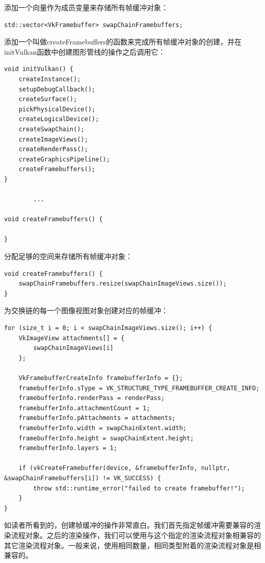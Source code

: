 \documentclass{ctexart}
\begin{document}
添加一个向量作为成员变量来存储所有帧缓冲对象：

\begin{lstlisting}[language={[ANSI]C}]
std::vector<VkFramebuffer> swapChainFramebuffers;
\end{lstlisting}

添加一个叫做createFramebuffers的函数来完成所有帧缓冲对象的创建，并在initVulkan函数中创建图形管线的操作之后调用它：

\begin{lstlisting}[language={[ANSI]C}]
void initVulkan() {
	createInstance();
	setupDebugCallback();
	createSurface();
	pickPhysicalDevice();
	createLogicalDevice();
	createSwapChain();
	createImageViews();
	createRenderPass();
	createGraphicsPipeline();
	createFramebuffers();
}

		...

void createFramebuffers() {

}
\end{lstlisting}

分配足够的空间来存储所有帧缓冲对象：

\begin{lstlisting}[language={[ANSI]C}]
void createFramebuffers() {
	swapChainFramebuffers.resize(swapChainImageViews.size());
}
\end{lstlisting}

为交换链的每一个图像视图对象创建对应的帧缓冲：

\begin{lstlisting}[language={[ANSI]C}]
for (size_t i = 0; i < swapChainImageViews.size(); i++) {
	VkImageView attachments[] = {
		swapChainImageViews[i]
	};

	VkFramebufferCreateInfo framebufferInfo = {};
	framebufferInfo.sType = VK_STRUCTURE_TYPE_FRAMEBUFFER_CREATE_INFO;
	framebufferInfo.renderPass = renderPass;
	framebufferInfo.attachmentCount = 1;
	framebufferInfo.pAttachments = attachments;
	framebufferInfo.width = swapChainExtent.width;
	framebufferInfo.height = swapChainExtent.height;
	framebufferInfo.layers = 1;

	if (vkCreateFramebuffer(device, &framebufferInfo, nullptr, &swapChainFramebuffers[i]) != VK_SUCCESS) {
		throw std::runtime_error("failed to create framebuffer!");
	}
}
\end{lstlisting}

如读者所看到的，创建帧缓冲的操作非常直白。我们首先指定帧缓冲需要兼容的渲染流程对象。之后的渲染操作，我们可以使用与这个指定的渲染流程对象相兼容的其它渲染流程对象。一般来说，使用相同数量，相同类型附着的渲染流程对象是相兼容的。
\end{document}

